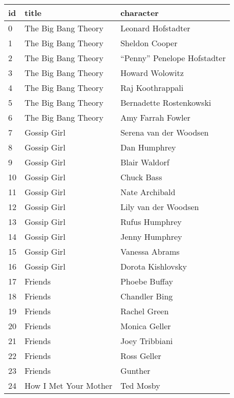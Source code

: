 \begin{table}[htbp]
\small
\begin{tabularx}{0.70\textwidth}{lXX}
\toprule
\textbf{id} & \textbf{title} & \textbf{character} \\
\midrule
0  & The Big Bang Theory    & Leonard Hofstadter     \\
1  & The Big Bang Theory    & Sheldon Cooper         \\
2  & The Big Bang Theory    & ``Penny'' Penelope Hofstadter    \\
3  & The Big Bang Theory    & Howard Wolowitz        \\
4  & The Big Bang Theory    & Raj Koothrappali       \\
5  & The Big Bang Theory    & Bernadette Rostenkowski\\
6  & The Big Bang Theory    & Amy Farrah Fowler      \\
7  & Gossip Girl            & Serena van der Woodsen \\
8  & Gossip Girl            & Dan Humphrey           \\
9  & Gossip Girl            & Blair Waldorf          \\
10 & Gossip Girl            & Chuck Bass             \\
11 & Gossip Girl            & Nate Archibald         \\
12 & Gossip Girl            & Lily van der Woodsen   \\
13 & Gossip Girl            & Rufus Humphrey         \\
14 & Gossip Girl            & Jenny Humphrey         \\
15 & Gossip Girl            & Vanessa Abrams         \\
16 & Gossip Girl            & Dorota Kishlovsky      \\
17 & Friends                & Phoebe Buffay          \\
18 & Friends                & Chandler Bing          \\
19 & Friends                & Rachel Green           \\
20 & Friends                & Monica Geller          \\
21 & Friends                & Joey Tribbiani         \\
22 & Friends                & Ross Geller            \\
23 & Friends                & Gunther                \\
24 & How I Met Your Mother  & Ted Mosby              \\

\end{tabularx}
\end{table}
